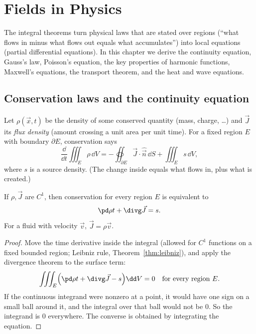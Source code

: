 \chapter{Fields in Physics}
\label{ch:physics}

The integral theorems turn physical laws that are stated over regions (``what flows in minus what flows out equals what accumulates'') into local equations (partial differential equations). In this chapter we derive the continuity equation, Gauss's law, Poisson's equation, the key properties of harmonic functions, Maxwell's equations, the transport theorem, and the heat and wave equations.

\section{Conservation laws and the continuity equation}

Let $\rho(\vec x,t)$ be the density of some conserved quantity (mass, charge, \dots) and $\vec J$ its \emph{flux density} (amount crossing a unit area per unit time). For a fixed region $E$ with boundary $\partial E$, conservation says
\[
\frac{\dd}{\dd t}\iiint_E\rho\,\dd V=-\oiint_{\partial E}\vec J\cdot\hat{\vec n}\,\dd S+\iiint_Es\,\dd V,
\]
where $s$ is a source density. (The change inside equals what flows in, plus what is created.)

\begin{theorem}\label{thm:continuity}
If $\rho,\vec J$ are $C^1$, then conservation for every region $E$ is equivalent to
\[
\pd\rho t+\divg\vec J=s .
\]
For a fluid with velocity $\vec v$, $\vec J=\rho\vec v$.
\end{theorem}

\begin{proof}
Move the time derivative inside the integral (allowed for $C^1$ functions on a fixed bounded region; Leibniz rule, Theorem~\ref{thm:leibniz}), and apply the divergence theorem to the surface term:
\[
\iiint_E\Bigl(\pd\rho t+\divg\vec J-s\Bigr)\dd V=0\quad\text{for every region }E.
\]
If the continuous integrand were nonzero at a point, it would have one sign on a small ball around it, and the integral over that ball would not be $0$. So the integrand is $0$ everywhere. The converse is obtained by integrating the equation.
\end{proof}

